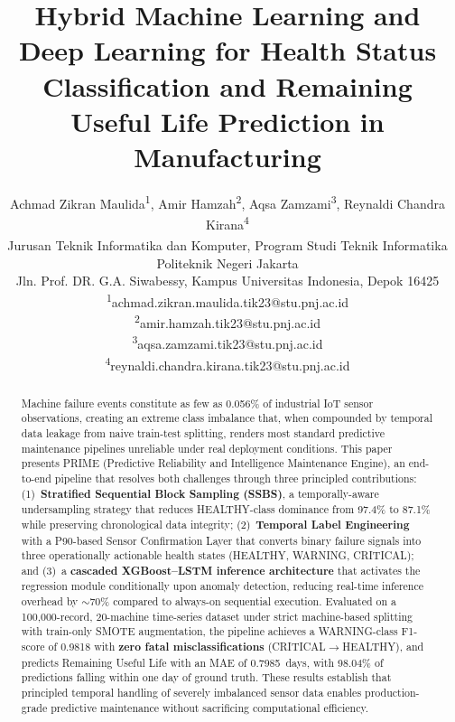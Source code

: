 \documentclass[conference]{IEEEtran}
\begin{document}
\title{Hybrid Machine Learning and Deep Learning for Health Status Classification and Remaining Useful Life Prediction in Manufacturing}

\author{
Achmad Zikran Maulida\textsuperscript{1},
Amir Hamzah\textsuperscript{2},
Aqsa Zamzami\textsuperscript{3}, 
Reynaldi Chandra Kirana\textsuperscript{4} \\

\textsuperscript{}Jurusan Teknik Informatika dan Komputer, 
Program Studi Teknik Informatika \\
Politeknik Negeri Jakarta \\
Jln. Prof. DR. G.A. Siwabessy, Kampus Universitas Indonesia, Depok 16425 \\

\textsuperscript{1}achmad.zikran.maulida.tik23@stu.pnj.ac.id \\
\textsuperscript{2}amir.hamzah.tik23@stu.pnj.ac.id \\
\textsuperscript{3}aqsa.zamzami.tik23@stu.pnj.ac.id \\
\textsuperscript{4}reynaldi.chandra.kirana.tik23@stu.pnj.ac.id
}
\maketitle

\begin{abstract}
Machine failure events constitute as few as 0.056\% of industrial
IoT sensor observations, creating an extreme class imbalance that,
when compounded by temporal data leakage from naive train-test
splitting, renders most standard predictive maintenance pipelines
unreliable under real deployment conditions. This paper presents
PRIME (Predictive Reliability and Intelligence Maintenance Engine),
an end-to-end pipeline that resolves both challenges through three
principled contributions: (1)~\textbf{Stratified Sequential Block
Sampling (SSBS)}, a temporally-aware undersampling strategy that
reduces HEALTHY-class dominance from 97.4\% to 87.1\% while
preserving chronological data integrity; (2)~\textbf{Temporal Label
Engineering} with a P90-based Sensor Confirmation Layer that
converts binary failure signals into three operationally actionable
health states (HEALTHY, WARNING, CRITICAL); and (3)~a
\textbf{cascaded XGBoost--LSTM inference architecture} that
activates the regression module conditionally upon anomaly
detection, reducing real-time inference overhead by
$\sim$70\% compared to always-on sequential execution. Evaluated
on a 100,000-record, 20-machine time-series dataset under strict
machine-based splitting with train-only SMOTE augmentation, the
pipeline achieves a WARNING-class F1-score of 0.9818 with
\textbf{zero fatal misclassifications} (CRITICAL$\rightarrow$HEALTHY),
and predicts Remaining Useful Life with an MAE of 0.7985~days,
with 98.04\% of predictions falling within one day of ground truth.
These results establish that principled temporal handling of
severely imbalanced sensor data enables production-grade predictive
maintenance without sacrificing computational efficiency.
\end{abstract}
\end{document}
